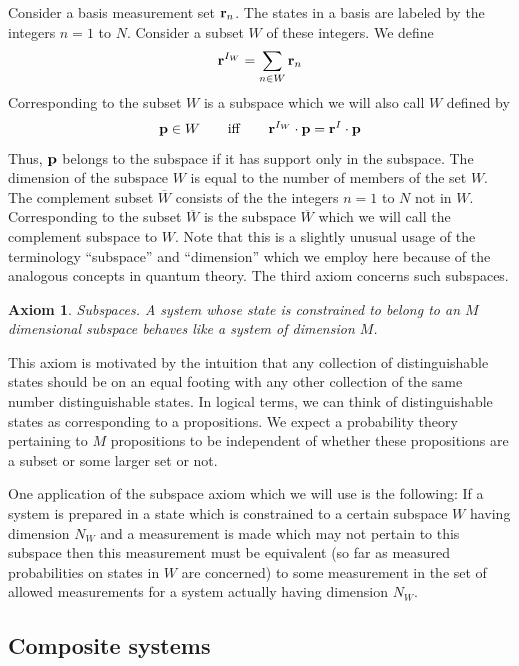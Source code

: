 \documentclass[10pt,twocolumn]{article}
\newtheorem{axiom}{Axiom}
\begin{document}
Consider a basis measurement set ${\bf r}_n$. The states in a basis are
labeled by the integers $n=1$ to $N$. Consider a subset $W$ of these
integers. We define
\begin{equation}
{\bf r}^{I_W}=\sum_{n\in W} {\bf r}_n
\end{equation}
Corresponding to the subset $W$ is a subspace which we will also call
$W$ defined by
\begin{equation}
{\bf p}\in W \qquad {\rm iff}\qquad
{\bf r}^{I_W}\cdot{\bf p}={\bf r}^{I}\cdot{\bf p}
\end{equation}
Thus, ${\bf p}$ belongs to the subspace if it has support only in the
subspace.  The dimension of the subspace $W$ is equal to the number of
members of the set $W$. The complement subset $\overline{W}$ consists of
the the integers $n=1$ to $N$ not in $W$.  Corresponding to the subset
$\overline{W}$ is the subspace $\overline{W}$ which we will call the
complement subspace to $W$.
Note that this is a slightly unusual usage of the
terminology ``subspace'' and ``dimension''
which we employ here because of the analogous concepts in quantum theory.
The third axiom concerns such subspaces.
\begin{axiom}
{\rm Subspaces}. A system whose state is constrained to belong to an $M$
dimensional subspace behaves like a system of dimension $M$.
\end{axiom}
This axiom is motivated by the intuition that any
collection of distinguishable states should be on an equal
footing with any other collection of the same number distinguishable
states.  In logical terms, we can think of distinguishable states as
corresponding to a propositions.  We expect a probability theory
pertaining to $M$ propositions to be independent of whether these
propositions are a subset or some larger set or not.

One application of the subspace axiom which we will use is the
following: If a system is prepared in a state which is constrained to a
certain subspace $W$ having dimension $N_W$ and a measurement is made
which may not pertain to
this subspace then this measurement must be equivalent (so far as
measured probabilities on states in $W$ are concerned) to some
measurement in the set of allowed measurements for a system actually
having dimension $N_W$.

\subsection{Composite systems}\label{compositesystems}
\end{document}
